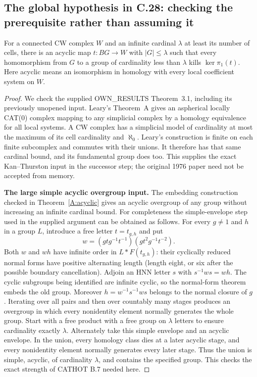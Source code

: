 \subsection{The global hypothesis in C.28: checking the prerequisite rather than assuming it}
\begin{lemma}\label{F:large-resolution}
For a connected CW complex $W$ and an infinite cardinal $\lambda$ at
least its number of cells, there is an acyclic map $t:BG\to W$ with
$|G|\leq\lambda$ such that every homomorphism from $G$ to a group of
cardinality less than $\lambda$ kills $\ker\pi_1(t)$. Here acyclic means
an isomorphism in homology with every local coefficient system on $W$.
\end{lemma}
\begin{proof}
We check the supplied \textsc{OWN\_RESULTS} Theorem~3.1, including its
previously unopened input. Leary's Theorem~A \cite[p.~2]{leary2013}
gives an aspherical locally CAT(0) complex mapping to any simplicial
complex by a homology equivalence for all local systems. A CW complex
has a simplicial model of cardinality at most the maximum of its cell
cardinality and $\aleph_0$. Leary's construction is finite on each finite
subcomplex and commutes with their unions. It therefore has that same
cardinal bound, and its fundamental group does too. This supplies the
exact Kan--Thurston input in the successor step; the original 1976 paper
need not be accepted from memory.

\textbf{The large simple acyclic overgroup input.} The embedding
construction checked in Theorem~\ref{A:acyclic} gives an acyclic
overgroup of any group without increasing an infinite cardinal bound.
For completeness the simple-envelope step used in the supplied argument
can be obtained as follows. For every $g\ne1$ and $h$ in a group $L$,
introduce a free letter $t=t_{g,h}$ and put
\[
 w=(gtg^{-1}t^{-1})(gt^2g^{-1}t^{-2}).
\]
Both $w$ and $wh$ have infinite order in $L*F(t_{g,h})$: their cyclically
reduced normal forms have positive alternating length (length eight,
or six after the possible boundary cancellation). Adjoin an HNN letter
$s$ with $s^{-1}ws=wh$. The cyclic subgroups being identified are
infinite cyclic, so the normal-form theorem embeds the old group.
Moreover $h=w^{-1}s^{-1}ws$ belongs to the normal closure of $g$.
Iterating over all pairs and then over countably many stages produces
an overgroup in which every nonidentity element normally generates the
whole group. Start with a free product with a free group on $\lambda$
letters to ensure cardinality exactly $\lambda$. Alternately take this
simple envelope and an acyclic envelope. In the union, every homology
class dies at a later acyclic stage, and every nonidentity element
normally generates every later stage. Thus the union is simple,
acyclic, of cardinality $\lambda$, and contains the specified group.
This checks the exact strength of CATHOT B.7 needed here.


\end{proof}
